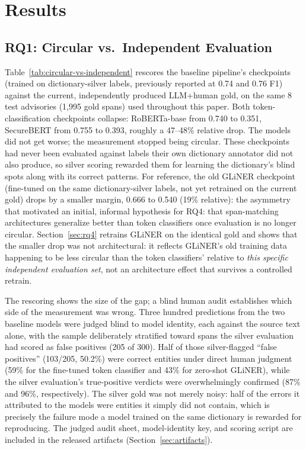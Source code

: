 \documentclass[11pt]{article}
\begin{document}
\section{Results}
\label{sec:results}

\subsection{RQ1: Circular vs.\ Independent Evaluation}
\label{sec:rq1}

Table~\ref{tab:circular-vs-independent} rescores the baseline pipeline's
checkpoints (trained on dictionary-silver labels, previously reported at
0.74 and 0.76 F1) against the current, independently produced LLM+human
gold, on the same 8 test advisories (1{,}995 gold spans) used throughout
this paper. Both token-classification checkpoints collapse: RoBERTa-base
from 0.740 to 0.351, SecureBERT from 0.755 to 0.393, roughly a 47--48\%
relative drop. The models did not get worse; the measurement stopped being
circular. These checkpoints had never been evaluated against labels their
own dictionary annotator did not also produce, so silver scoring rewarded
them for learning the dictionary's blind spots along with its correct
patterns. For reference, the old GLiNER checkpoint (fine-tuned on the same
dictionary-silver labels, not yet retrained on the current gold) drops by a
smaller margin, 0.666 to 0.540 (19\% relative): the asymmetry that
motivated an initial, informal hypothesis for RQ4: that span-matching
architectures generalize better than token classifiers once evaluation is
no longer circular. Section~\ref{sec:rq4} retrains GLiNER on the identical
gold and shows that the smaller drop was not architectural: it reflects
GLiNER's old training data happening to be less circular than the token
classifiers' relative to \emph{this specific independent evaluation set},
not an architecture effect that survives a controlled retrain.

The rescoring shows the size of the gap; a blind human audit establishes
which side of the measurement was wrong. Three hundred predictions from the
two baseline models were judged blind to model identity, each against the
source text alone, with the sample deliberately stratified toward spans the
silver evaluation had scored as false positives (205 of 300). Half of those
silver-flagged ``false positives'' (103/205, 50.2\%) were correct entities
under direct human judgment (59\% for the fine-tuned token classifier and
43\% for zero-shot GLiNER), while the silver evaluation's true-positive
verdicts were overwhelmingly confirmed (87\% and 96\%, respectively). The
silver gold was not merely noisy: half of the errors it attributed to the
models were entities it simply did not contain, which is precisely the
failure mode a model trained on the same dictionary is rewarded for
reproducing. The judged audit sheet, model-identity key, and scoring script
are included in the released artifacts (Section~\ref{sec:artifacts}).
\end{document}
